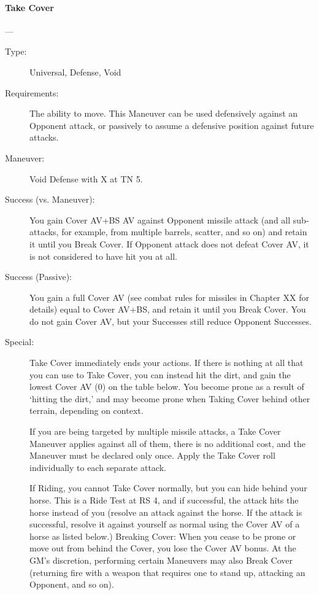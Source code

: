 \documentclass[oneside,11pt,english]{book}
\begin{document}
\paragraph{\large\label{man:Take Cover}Take Cover}---
\vspace{-10pt}\begin{description} 
\item [Type:] Universal, Defense, Void 
\item [Requirements:] The ability to move. This Maneuver can be used defensively against an Opponent attack, or passively to assume a defensive position against future attacks. 
\item [Maneuver:] Void Defense with X at TN 5. 
\item [Success (vs. Maneuver):] You gain Cover AV+BS AV against Opponent missile attack (and all sub-
  attacks, for example, from multiple barrels, scatter, and so on) and retain it until you Break Cover. If 
  Opponent attack does not defeat Cover AV, it is not considered to have hit you at all. 
\item [Success (Passive):] You gain a full Cover AV (see combat rules for missiles in Chapter XX for details) equal to Cover AV+BS, and retain it until you Break Cover.
  \subitem [Failure:] You do not gain Cover AV, but your Successes still reduce Opponent Successes.
\item [Special:] Take Cover immediately ends your actions. If there is nothing
  at all that you can use to Take Cover, you can instead hit the dirt, and gain
  the lowest Cover AV (0) on the table below. You become prone as a result of
  ‘hitting the dirt,’ and may become prone when Taking Cover behind other
  terrain, depending on context.
  
  If you are being targeted by multiple missile attacks, a Take Cover Maneuver
  applies against all of them, there is no additional cost, and the Maneuver
  must be declared only once. Apply the Take Cover roll individually to each
  separate attack. 

  If Riding, you cannot Take Cover normally, but you can hide behind your horse.
  This is a Ride Test at RS 4, and if successful, the attack hits the horse
  instead of you (resolve an attack against the horse. If the attack is
  successful, resolve it against yourself as normal using the Cover AV of a
  horse as listed below.) Breaking Cover: When you cease to be prone or move out
  from behind the Cover, you lose the Cover AV bonus. At the GM’s discretion,
  performing certain Maneuvers may also Break Cover (returning fire with a
  weapon that requires one to stand up, attacking an Opponent, and so on). 
\end{description}
\end{document}
